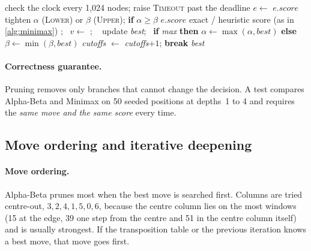 \documentclass[11pt,a4paper]{article}
\newcommand{\code}[1]{\texttt{\small #1}}
\begin{document}
\begin{algorithm}[ht]
\caption{Alpha-Beta with transposition table and move ordering (\code{agents/alphabeta.py})}\label{alg:ab}
\begin{algorithmic}[1]
  \State check the clock every 1{,}024 nodes; raise \textsc{Timeout} past the deadline
  \State $e \gets$ 
   
     \Return $e.\textit{score}$ \EndIf
    \State tighten $\alpha$ (\textsc{Lower}) or $\beta$ (\textsc{Upper}); \textbf{if} $\alpha\ge\beta$ \Return $e.\textit{score}$
  \EndIf
   \Return exact / heuristic score (as in \cref{alg:minimax}) \EndIf
   
    \State {}; \ $v \gets$ ; \ 
    \State update \textit{best}; \ \textbf{if} \textit{max} \textbf{then} $\alpha\gets\max(\alpha,\textit{best})$ \textbf{else} $\beta\gets\min(\beta,\textit{best})$
    \If{$\alpha \ge \beta$} \textit{cutoffs} $\gets$ \textit{cutoffs}$+1$; \textbf{break} \EndIf
  \EndFor
  \State {}
  \State \Return \textit{best}
\EndFunction
\end{algorithmic}
\end{algorithm}

\paragraph{Correctness guarantee.} Pruning removes only branches that cannot change the decision. A test compares Alpha-Beta and Minimax on 50 seeded positions at depths~1 to 4 and requires the \emph{same move and the same score} every time.

\subsection{Move ordering and iterative deepening}
\paragraph{Move ordering.} Alpha-Beta prunes most when the best move is searched first. Columns are tried centre-out, $3,2,4,1,5,0,6$, because the centre column lies on the most windows (15 at the edge, 39 one step from the centre and 51 in the centre column itself) and is usually strongest. If the transposition table or the previous iteration knows a best move, that move goes first.
\end{document}
